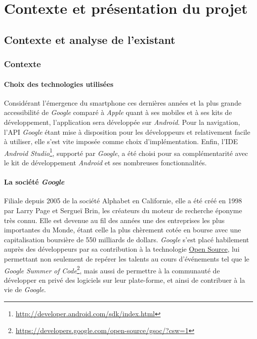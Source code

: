 \chapter{Contexte et présentation du projet}

\section{Contexte et analyse de l'existant}

\subsection{Contexte}

\subsubsection{Choix des technologies utilisées}
Considérant l'émergence du smartphone ces dernières années et la plus grande accessibilité de \textit{Google} comparé à \textit{Apple} quant à ses mobiles et à ses kits de développement, l'application sera développée sur \textit{Android}. Pour la navigation, l'API \textit{Google} étant mise à disposition pour les développeurs et relativement facile à utiliser, elle s'est vite imposée comme choix d'implémentation. Enfin, l'IDE \textit{Android Studio}\footnote{\url{http://developer.android.com/sdk/index.html}}, supporté par \textit{Google}, a été choisi pour sa complémentarité avec le kit de développement \textit{Android} et ses nombreuses fonctionnalités.\\

\subsubsection{La société \emph{Google}} Filiale depuis 2005 de la société Alphabet en Californie, elle a été créé en 1998 par Larry Page et Sergueï Brin, les créateurs du moteur de recherche éponyme très connu. Elle est devenue au fil des années une des entreprises les plus importantes du Monde, étant celle la plus chèrement cotée en bourse avec une capitalisation boursière de 550 milliards de dollars.\newline
\textit{Google} s'est placé habilement auprès des développeurs par sa contribution à la technologie \underline{Open Source}, lui permettant non seulement de repérer les talents au cours d'événements tel que le \textit{Google Summer of Code}\footnote{\url{https://developers.google.com/open-source/gsoc/?csw=1}}, mais aussi de permettre à la communauté de développer en privé des logiciels sur leur plate-forme, et ainsi de contribuer à la vie de \textit{Google}.

